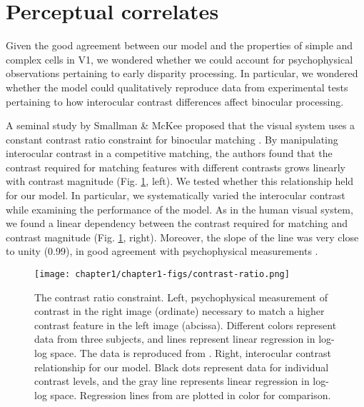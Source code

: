 \clearpage
\section{Perceptual correlates}

Given the good agreement between our model and the properties of simple and complex cells in V1, we wondered whether we could account for psychophysical observations pertaining to early disparity processing. In particular, we wondered whether the model could qualitatively reproduce data from experimental tests pertaining to how interocular contrast differences affect binocular processing. 

A seminal study by Smallman \& McKee proposed that the visual system uses a constant contrast ratio constraint for binocular matching \cite{Smallman:1995fk}. By manipulating interocular contrast in a competitive matching, the authors found that the contrast required for matching features with different contrasts grows linearly with contrast magnitude (Fig. \ref{fig:ContrastRatio}, left). We tested whether this relationship held for our model. In particular, we systematically varied the interocular contrast while examining the performance of the model. As in the human visual system, we found a linear dependency between the contrast required for matching and contrast magnitude (Fig. \ref{fig:ContrastRatio}, right). Moreover, the slope of the line was very close to unity (0.99), in good agreement with psychophysical measurements \cite{Smallman:1995fk}.

\begin{figure}[!h]
  \centering
  \texttt{[image: chapter1/chapter1-figs/contrast-ratio.png]}
  \caption[Contrast ratio constraint.]{The contrast ratio constraint. Left, psychophysical measurement of contrast in the right image (ordinate) necessary to match a higher contrast feature in the left image (abcissa). Different colors represent data from three subjects, and lines represent linear regression in log-log space. The data is reproduced from \cite{Smallman:1995fk}. Right, interocular contrast relationship for our model. Black dots represent data for individual contrast levels, and the gray line represents linear regression in log-log space. Regression lines from \cite{Smallman:1995fk} are plotted in color for comparison.}
  \label{fig:ContrastRatio}
\end{figure}


